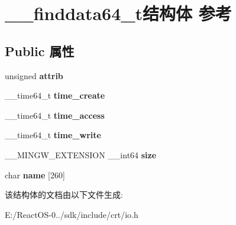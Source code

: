 \hypertarget{struct____finddata64__t}{}\section{\+\_\+\+\_\+finddata64\+\_\+t结构体 参考}
\label{struct____finddata64__t}
\subsection*{Public 属性}
\begin{DoxyCompactItemize}
\item 
\mbox{\label{struct____finddata64__t_af700bf2291f262cfaf8fe01ab712d1c8}} 
unsigned {\bfseries attrib}
\item 
\mbox{\label{struct____finddata64__t_a775bcacb888de4761f12f2bbd6a03c3e}} 
\+\_\+\+\_\+time64\+\_\+t {\bfseries time\+\_\+create}
\item 
\mbox{\label{struct____finddata64__t_a7646c385bce5261f4cb47a23c20fe9ff}} 
\+\_\+\+\_\+time64\+\_\+t {\bfseries time\+\_\+access}
\item 
\mbox{\label{struct____finddata64__t_a33e6981d392f4b742fa6a8846ba0c733}} 
\+\_\+\+\_\+time64\+\_\+t {\bfseries time\+\_\+write}
\item 
\mbox{\label{struct____finddata64__t_a594a8e6da6d93f6def64205d17b0eaf3}} 
\+\_\+\+\_\+\+M\+I\+N\+G\+W\+\_\+\+E\+X\+T\+E\+N\+S\+I\+ON \+\_\+\+\_\+int64 {\bfseries size}
\item 
\mbox{\label{struct____finddata64__t_a82670417b15dccfff8078aa94b86b1a4}} 
char {\bfseries name} \mbox{[}260\mbox{]}
\end{DoxyCompactItemize}


该结构体的文档由以下文件生成\+:\begin{DoxyCompactItemize}
\item 
E\+:/\+React\+O\+S-\/0../sdk/include/crt/io.\+h\end{DoxyCompactItemize}
